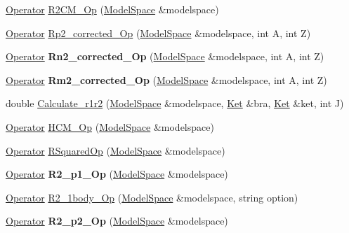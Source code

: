 \begin{DoxyCompactItemize}
\hyperlink{classOperator}{Operator} \hyperlink{namespaceimsrg__util_a2d145f9a5e7bd930b22a6c951ea6c2e2}{R2\+C\+M\+\_\+\+Op} (\hyperlink{classModelSpace}{Model\+Space} \&modelspace)
\item 
\hyperlink{classOperator}{Operator} \hyperlink{namespaceimsrg__util_adbff85835e84cb1be8757c76a324fe40}{Rp2\+\_\+corrected\+\_\+\+Op} (\hyperlink{classModelSpace}{Model\+Space} \&modelspace, int A, int Z)
\item 
\mbox{\label{namespaceimsrg__util_aeab5054dfaa30c6fae4cf054c0f1b750}} 
\hyperlink{classOperator}{Operator} {\bfseries Rn2\+\_\+corrected\+\_\+\+Op} (\hyperlink{classModelSpace}{Model\+Space} \&modelspace, int A, int Z)
\item 
\mbox{\label{namespaceimsrg__util_a29242fe1f3bca7d9ede1e00ae6da1959}} 
\hyperlink{classOperator}{Operator} {\bfseries Rm2\+\_\+corrected\+\_\+\+Op} (\hyperlink{classModelSpace}{Model\+Space} \&modelspace, int A, int Z)
\item 
double \hyperlink{namespaceimsrg__util_aa5d72d0bd9c75beb54256188e9ccfcbe}{Calculate\+\_\+r1r2} (\hyperlink{classModelSpace}{Model\+Space} \&modelspace, \hyperlink{classKet}{Ket} \&bra, \hyperlink{classKet}{Ket} \&ket, int J)
\item 
\hyperlink{classOperator}{Operator} \hyperlink{namespaceimsrg__util_aeb2fd25d4b70870b0fa01f652d996185}{H\+C\+M\+\_\+\+Op} (\hyperlink{classModelSpace}{Model\+Space} \&modelspace)
\item 
\hyperlink{classOperator}{Operator} \hyperlink{namespaceimsrg__util_aba418ce4d7d189c21a564ce487c671bd}{R\+Squared\+Op} (\hyperlink{classModelSpace}{Model\+Space} \&modelspace)
\item 
\mbox{\label{namespaceimsrg__util_a98b700ed249acb08e605181717aba58b}} 
\hyperlink{classOperator}{Operator} {\bfseries R2\+\_\+p1\+\_\+\+Op} (\hyperlink{classModelSpace}{Model\+Space} \&modelspace)
\item 
\hyperlink{classOperator}{Operator} \hyperlink{namespaceimsrg__util_a300ae3fc79d6513d4d3f0ff8b624caf2}{R2\+\_\+1body\+\_\+\+Op} (\hyperlink{classModelSpace}{Model\+Space} \&modelspace, string option)
\item 
\mbox{\label{namespaceimsrg__util_a5696a3fe971208fb1814a568bff93b08}} 
\hyperlink{classOperator}{Operator} {\bfseries R2\+\_\+p2\+\_\+\+Op} (\hyperlink{classModelSpace}{Model\+Space} \&modelspace)

\end{DoxyCompactItemize}
